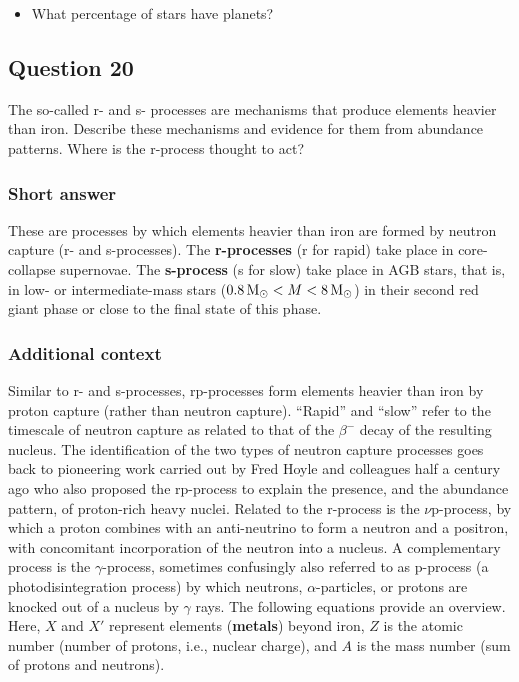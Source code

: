 \documentclass[a4paper,10pt]{article}
\begin{document}
\begin{itemize}
    \item What percentage of stars have planets?
\end{itemize}


\newpage
\subsection{Question 20}

The so-called r- and s- processes are mechanisms that produce elements heavier than iron. Describe these mechanisms and evidence for them from abundance patterns. Where is the r-process thought to act?

\subsubsection{Short answer}

These are processes by which elements heavier than iron are formed by neutron capture (r- and s-processes). The \textbf{r-processes} (r for rapid) take place in core-collapse supernovae. The \textbf{s-process} (s for slow) take place in AGB stars, that is, in low- or intermediate-mass stars ($0.8\,{\rm M_\odot}<M<8\,{\rm M_\odot}$) in their second red giant phase or close to the final state of this phase.

\subsubsection{Additional context}

Similar to r- and s-processes, rp-processes form elements heavier than iron by proton capture (rather than neutron capture). ``Rapid'' and ``slow'' refer to the timescale of neutron capture as related to that of the $\beta^-$ decay of the resulting nucleus. The identification of the two types of neutron capture processes goes back to pioneering work carried out by Fred Hoyle and colleagues half a century ago who also proposed the rp-process to explain the presence, and the abundance pattern, of proton-rich heavy nuclei. Related to the r-process is the $\nu$p-process, by which a proton combines with an anti-neutrino to form a neutron and a positron, with concomitant incorporation of the neutron into a nucleus. A complementary process is the $\gamma$-process, sometimes confusingly also referred to as p-process (a photodisintegration process) by which neutrons, $\alpha$-particles, or protons are knocked out of a nucleus by $\gamma$ rays. The following equations provide an overview. Here, $X$ and $X'$ represent elements (\textbf{metals}) beyond iron, $Z$ is the atomic number (number of protons, i.e., nuclear charge), and $A$ is the mass number (sum of protons and neutrons).
\end{document}
